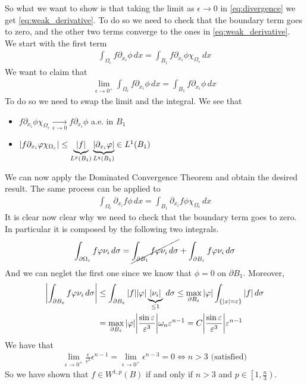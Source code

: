 So what we want to show is that taking the limit as \(\epsilon \to 0\) in \eqref{eq:divergence} we get \eqref{eq:weak_derivative}.
To do so we need to check that the boundary term goes to zero, and the other two terms converge to the ones in \eqref{eq:weak_derivative}. \\
We start with the first term
\[
    \begin{split}
        \int_{\Omega_\epsilon} f \partial_{x_i} \phi \, dx = \int_{B_1} f \partial_{x_i} \phi \chi_{\Omega_\epsilon} \, dx
    \end{split}
\]
We want to claim that
\[
    \begin{split}
        \lim_{\epsilon \to 0^+} \int_{\Omega_\epsilon} f \partial_{x_i} \phi \, dx = \int_{B_1} f \partial_{x_i} \phi \, dx
    \end{split}
\]
To do so we need to swap the limit and the integral. We see that
\begin{itemize}
    \item \(f \partial_{x_i} \phi \chi_{\Omega_\epsilon} \underset{\epsilon \to 0}{\longrightarrow} f \partial_{x_i} \phi\) a.e. in \(B_1\)
    \item \(\abs{f \partial_{x_i} \phi \chi_{\Omega_\epsilon}} \leq \underbrace{\abs{f}}_{L^p(B_1)} \underbrace{\abs{\partial_{x_i} \phi}}_{L^q(B_1)} \in L^1(B_1)\)
\end{itemize}
We can now apply the Dominated Convergence Theorem and obtain the desired result.
The same process can be applied to
\[
    \begin{split}
        \int_{\Omega_\epsilon} \partial_{x_i} f \phi \, dx = \int_{B_1} \partial_{x_i} f \phi \chi_{\Omega_\epsilon} \, dx
    \end{split}
\]
It is clear now clear why we need to check that the boundary term goes to zero.
In particular it is composed by the following two integrals.
\[
    \begin{split}
        \int_{\partial\Omega_\epsilon} f \phi \nu_i \, d\sigma = \cancel{\int_{\partial B_1} f \phi \nu_i \, d\sigma} + \int_{\partial B_\epsilon} f \phi \nu_i \, d\sigma
    \end{split}
\]
And we can neglet the first one since we know that $\phi = 0$ on $\partial
    B_1$. Moreover,
\[
    \begin{split}
        \abs{\int_{\partial B_\epsilon} f \phi \nu_i \, d\sigma} & \leq \int_{\partial B_\epsilon} \abs{f} \abs{\phi} \underbrace{\abs{\nu_i}}_{\leq 1} \, d\sigma \leq \max_{\partial B_\epsilon} \abs{\phi} \int_{\{ \abs{x} = \epsilon \}} \abs{f} \, d\sigma \\
                                                                 & = \max_{\partial B_\epsilon} \abs{\phi} \abs{\frac{\sin\epsilon}{\epsilon^3}} \omega_n \epsilon^{n-1} = C \abs{\frac{\sin\epsilon}{\epsilon^3}} \epsilon^{n-1}
    \end{split}
\]
We have that
\[
    \begin{split}
        \lim_{\epsilon \to 0^+} \frac{\epsilon}{\epsilon^3} \epsilon^{n-1} = \lim_{\epsilon \to 0^+} \epsilon^{n-3} = 0 \iff n > 3 \text{ (satisfied)}
    \end{split}
\]
So we have shown that $f \in W^{1, p}(B)$ if and only if $n>3$ and $p \in
    \left[1, \frac{n}{3}\right)$.

